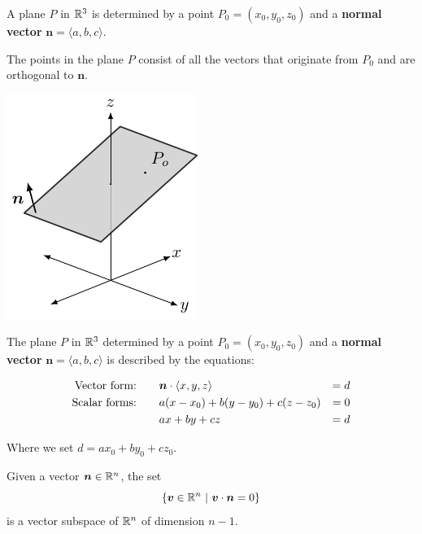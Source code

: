\begin{definition}
    A plane $P$ in $\mathbb{R}^3$ is determined by a point $P_0 = (x_0, y_0, z_0)$ and a \textbf{normal vector} $\bm{n} = \langle a, b, c \rangle$.  
    
    \vspace{1em}
    
    The points in the plane $P$ consist of all the vectors that originate from $P_0$ and are orthogonal to $\bm{n}$.
  

 \begin{center}        
        \includegraphics{chapters/1-LinearAlgebra/figures/figures-planenormalaffine.pdf}
    \end{center}

    
    \end{definition}

    
    \begin{theorem}
    The plane $P$ in $\mathbb{R}^3$ determined by a point $P_0 = (x_0, y_0, z_0)$ and a \textbf{normal vector} $\bm{n} = \langle a, b, c \rangle$ is described by the equations:
    
    \begin{align*}
        \textnormal{Vector form:} \qquad & \bm{n} \cdot \langle x, y , z \rangle &= d \\
        \textnormal{Scalar forms:} \qquad &  a(x-x_0) + b(y-y_0) + c(z-z_0) &= 0 \\
         & ax + by + cz &= d
    \end{align*}
    
    Where we set $d = ax_0 + by_0 + cz_0$.
    
    \end{theorem}


\begin{proposition}
    Given a vector $\bm{n} \in \mathbb{R}^n$, the set $$\{\bm{v} \in \mathbb{R}^n \ | \ \bm{v} \cdot \bm{n} = 0\}$$ is a vector subspace of $\mathbb{R}^n$ of dimension $n-1$.
\end{proposition}


